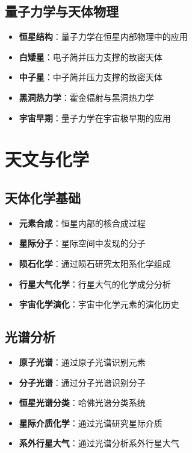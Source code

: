 \documentclass[12pt,UTF8]{ctexbook}
\begin{document}
\section{量子力学与天体物理}

\begin{itemize}
  \item \textbf{恒星结构}：量子力学在恒星内部物理中的应用
  \item \textbf{白矮星}：电子简并压力支撑的致密天体
  \item \textbf{中子星}：中子简并压力支撑的致密天体
  \item \textbf{黑洞热力学}：霍金辐射与黑洞热力学
  \item \textbf{宇宙早期}：量子力学在宇宙极早期的应用
\end{itemize}

\chapter{天文与化学}
\section{天体化学基础}

\begin{itemize}
  \item \textbf{元素合成}：恒星内部的核合成过程
  \item \textbf{星际分子}：星际空间中发现的分子
  \item \textbf{陨石化学}：通过陨石研究太阳系化学组成
  \item \textbf{行星大气化学}：行星大气的化学成分分析
  \item \textbf{宇宙化学演化}：宇宙中化学元素的演化历史
\end{itemize}

\section{光谱分析}

\begin{itemize}
  \item \textbf{原子光谱}：通过原子光谱识别元素
  \item \textbf{分子光谱}：通过分子光谱识别分子
  \item \textbf{恒星光谱分类}：哈佛光谱分类系统
  \item \textbf{星际介质化学}：通过光谱研究星际介质
  \item \textbf{系外行星大气}：通过光谱分析系外行星大气
\end{itemize}
\end{document}
